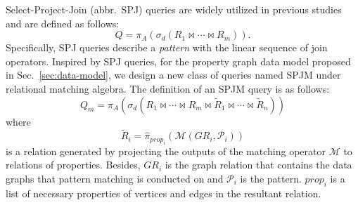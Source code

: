 Select-Project-Join (abbr.~SPJ) queries are widely utilized in previous studies \cite{spj} and are defined as follows:
\begin{equation*}
    Q = \pi_A(\sigma_d(R_1 \Join \cdots \Join R_m)).
\end{equation*}
Specifically, SPJ queries describe a \emph{pattern} with the linear sequence of join operators.
Inspired by SPJ queries, for the property graph data model proposed in Sec.~\ref{sec:data-model}, we design a new class of queries named SPJM under relational matching algebra.
The definition of an SPJM query is as follows:
\begin{equation*}
    Q_m = \pi_A(\sigma_d(R_1 \Join \cdots \Join R_m \Join \widetilde{R}_1 \Join \cdots \Join \widetilde{R}_n))
\end{equation*}
where
\begin{equation*}
    \tilde{R}_i = \hat{\pi}_{prop_i}(\mathcal{M}(GR_i, \mathcal{P}_i))
\end{equation*}
is a relation generated by projecting the outputs of the matching operator $\mathcal{M}$ to relations of properties.
Besides, $GR_i$ is the graph relation that contains the data graphs that pattern matching is conducted on and $\mathcal{P}_i$ is the pattern.
$prop_i$ is a list of necessary properties of vertices and edges in the resultant relation.

